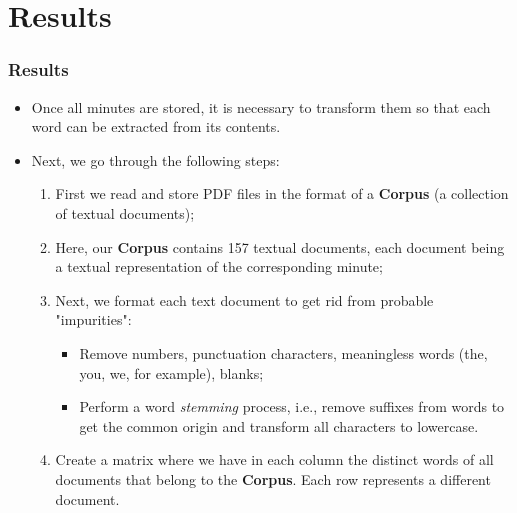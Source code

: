 \documentclass[aspectratio=169]{beamer}
\begin{document}

\section{Results}

\begin{frame}\frametitle{Results}
  \begin{itemize}
    \item Once all minutes are stored, it is necessary to transform them so that each word can be extracted from its contents. 
    \item Next, we go through the following steps:
      \begin{enumerate}
        \item First we read and store PDF files in the format of a \textbf{Corpus} (a collection of textual documents);
        \item Here, our \textbf{Corpus} contains 157 textual documents, each document being a textual representation of the corresponding minute;
        \item Next, we format each text document to get rid from probable "impurities": 
        \begin{itemize}
          \item Remove numbers, punctuation characters, meaningless words (the, you, we, for example), blanks;
          \item Perform a word \emph{stemming} process, i.e., remove suffixes from words to get the common
          origin and transform all characters to lowercase.
        \end{itemize}
        \item Create a matrix where we have in each column the distinct words of all documents that belong to the \textbf{Corpus}. Each row represents a different document.
        \end{enumerate}
  \end{itemize}
\end{frame}
\end{document}
